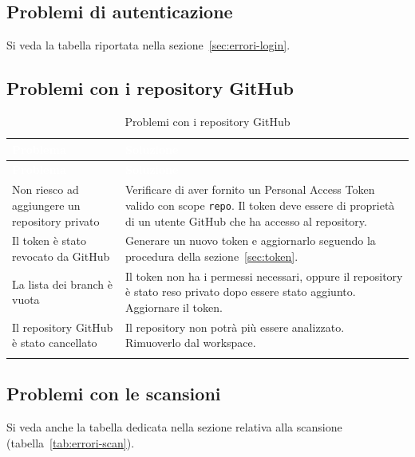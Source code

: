 \documentclass[a4paper, 11pt]{article}
\begin{document}
\subsection{Problemi di autenticazione}
Si veda la tabella riportata nella sezione~\ref{sec:errori-login}.

\subsection{Problemi con i repository GitHub}

\begin{longtable}{>{\raggedright\arraybackslash}p{5cm} >{\raggedright\arraybackslash}p{9cm}}
  \rowcolor{AccentColor}
  \textcolor{white}{\textbf{Problema}} &
  \textcolor{white}{\textbf{Soluzione}} \\
  \endfirsthead

  \rowcolor{AccentColor}
  \textcolor{white}{\textbf{Problema}} &
  \textcolor{white}{\textbf{Soluzione}} \\
  \endhead

  Non riesco ad aggiungere un repository privato &
  Verificare di aver fornito un Personal Access Token valido con scope \texttt{repo}. Il token deve essere di proprietà di un utente GitHub che ha accesso al repository. \\
  Il token è stato revocato da GitHub &
  Generare un nuovo token e aggiornarlo seguendo la procedura della sezione~\ref{sec:token}. \\
  La lista dei branch è vuota &
  Il token non ha i permessi necessari, oppure il repository è stato reso privato dopo essere stato aggiunto. Aggiornare il token. \\
  Il repository GitHub è stato cancellato &
  Il repository non potrà più essere analizzato. Rimuoverlo dal workspace. \\
\caption{Problemi con i repository GitHub}
\label{tab:problemi-repo}
\end{longtable}

\subsection{Problemi con le scansioni}
Si veda anche la tabella dedicata nella sezione relativa alla scansione (tabella~\ref{tab:errori-scan}).
\end{document}
